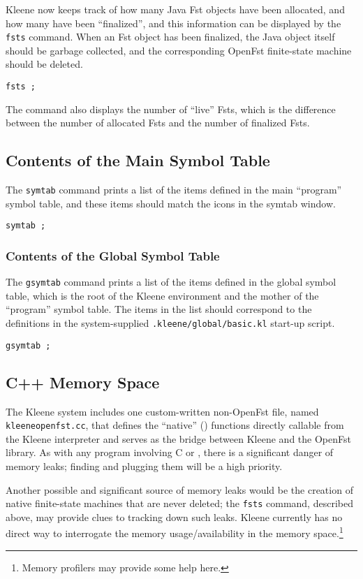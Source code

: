 Kleene now keeps track of how many Java Fst objects have been allocated,
and how many have been ``finalized'', and this information can be
displayed by the \texttt{fsts} command.  When an Fst object has been
finalized, the Java object itself should be garbage collected, and the
corresponding OpenFst finite-state machine should be deleted.

\begin{Verbatim}
fsts ;
\end{Verbatim}

\noindent
The command also displays the number of ``live'' Fsts, which is the
difference between the number of allocated Fsts and the number of finalized Fsts.

\subsection{Contents of the Main Symbol Table}

The \texttt{symtab} command prints a list of the items defined in the main
``program'' symbol table, and these items should match the icons in the  symtab
window.

\begin{Verbatim}
symtab ;
\end{Verbatim}

\subsubsection{Contents of the Global Symbol Table}

The \texttt{gsymtab} command prints a list of the items defined in the global symbol
table, which is the root of the Kleene environment and the mother of the
``program'' symbol table.  The items in the list should correspond to the definitions
in the system-supplied \texttt{.kleene/global/basic.kl} start-up script.

\begin{Verbatim}
gsymtab ;
\end{Verbatim}

\subsection{C++ Memory Space}

The Kleene system includes one custom-written non-OpenFst \CPP{} file,
named \texttt{kleeneopenfst.cc}, that defines the ``native'' (\CPP{})
functions directly callable from the Kleene interpreter and serves as the
 bridge between Kleene and the OpenFst library.  As with any
program involving C or \CPP{}, there is a significant danger of memory
leaks; finding and plugging them will be a high priority.

Another possible and significant source of \CPP{} memory leaks would be
the creation of native finite-state machines that are never deleted; the
\texttt{fsts} command, described above, may provide clues to tracking
down such leaks.  Kleene currently has no direct way to interrogate the
memory usage/availability in the \CPP{} memory space.\footnote{Memory
profilers may provide some help here.}


